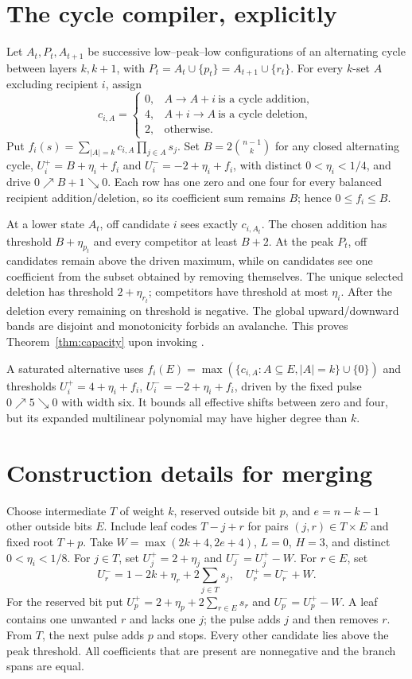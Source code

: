 \documentclass[12pt,letterpaper]{article}
\theoremstyle{definition}\newtheorem{definition}[theorem]{Definition}
\theoremstyle{remark}\newtheorem{remark}[theorem]{Remark}
\begin{document}
\section{The cycle compiler, explicitly}\label{app:compiler}
Let $A_t,P_t,A_{t+1}$ be successive low--peak--low configurations of an alternating cycle between layers $k,k+1$, with $P_t=A_t\cup\{p_t\}=A_{t+1}\cup\{r_t\}$. For every $k$-set $A$ excluding recipient $i$, assign
\begin{equation}\label{eq:labels}
 c_{i,A}=\begin{cases}0,& A\to A+i\ \text{is a cycle addition},\\4,& A+i\to A\ \text{is a cycle deletion},\\2,&\text{otherwise}.\end{cases}
\end{equation}
Put $f_i(s)=\sum_{|A|=k}c_{i,A}\prod_{j\in A}s_j$. Set $B=2\binom{n-1}{k}$ for any closed alternating cycle, $U_i^+=B+\eta_i+f_i$ and $U_i^-=-2+\eta_i+f_i$, with distinct $0<\eta_i<1/4$, and drive $0\nearrow B+1\searrow0$. Each row has one zero and one four for every balanced recipient addition/deletion, so its coefficient sum remains $B$; hence $0\le f_i\le B$.

At a lower state $A_t$, off candidate $i$ sees exactly $c_{i,A_t}$. The chosen addition has threshold $B+\eta_{p_t}$ and every competitor at least $B+2$. At the peak $P_t$, off candidates remain above the driven maximum, while on candidates see one coefficient from the subset obtained by removing themselves. The unique selected deletion has threshold $2+\eta_{r_t}$; competitors have threshold at most $\eta_i$. After the deletion every remaining on threshold is negative. The global upward/downward bands are disjoint and monotonicity forbids an avalanche. This proves Theorem~\ref{thm:capacity} upon invoking \citep[Thm.~9]{mutzesu2017}.

A saturated alternative uses $f_i(E)=\max(\{c_{i,A}:A\subseteq E,|A|=k\}\cup\{0\})$ and thresholds $U_i^+=4+\eta_i+f_i$, $U_i^-=-2+\eta_i+f_i$, driven by the fixed pulse $0\nearrow5\searrow0$ with width six. It bounds all effective shifts between zero and four, but its expanded multilinear polynomial may have higher degree than $k$.

\section{Construction details for merging}\label{app:reset}
Choose intermediate $T$ of weight $k$, reserved outside bit $p$, and $e=n-k-1$ other outside bits $E$. Include leaf codes $T-j+r$ for pairs $(j,r)\in T\times E$ and fixed root $T+p$. Take $W=\max(2k+4,2e+4)$, $L=0$, $H=3$, and distinct $0<\eta_i<1/8$. For $j\in T$, set $U_j^+=2+\eta_j$ and $U_j^-=U_j^+-W$. For $r\in E$, set
\[
 U_r^-=1-2k+\eta_r+2\sum_{j\in T}s_j,\quad U_r^+=U_r^-+W.
\]
For the reserved bit put $U_p^+=2+\eta_p+2\sum_{r\in E}s_r$ and $U_p^-=U_p^+-W$. A leaf contains one unwanted $r$ and lacks one $j$; the pulse adds $j$ and then removes $r$. From $T$, the next pulse adds $p$ and stops. Every other candidate lies above the peak threshold. All coefficients that are present are nonnegative and the branch spans are equal.
\end{document}
